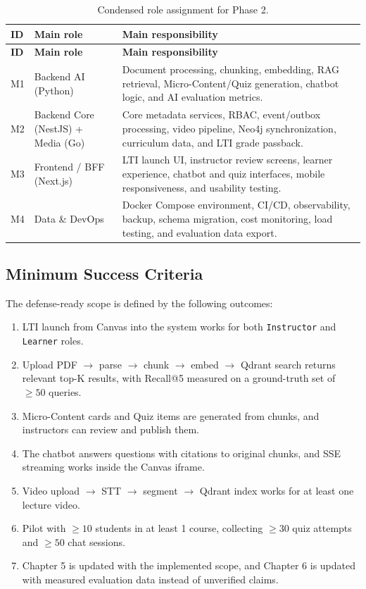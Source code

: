 \begin{longtable}{|p{1.2cm}|p{3.4cm}|p{9.5cm}|}
    \caption{Condensed role assignment for Phase 2.}
    \label{tab:roles-gd2} \\
    \hline
    \textbf{ID} & \textbf{Main role} & \textbf{Main responsibility} \\
    \hline
    \endfirsthead
    \hline
    \textbf{ID} & \textbf{Main role} & \textbf{Main responsibility} \\
    \hline
    \endhead

    M1 & Backend AI (Python)
       & Document processing, chunking, embedding, RAG retrieval,
         Micro-Content/Quiz generation, chatbot logic, and AI evaluation
         metrics. \\
    \hline
    M2 & Backend Core (NestJS) + Media (Go)
       & Core metadata services, RBAC, event/outbox processing, video
         pipeline, Neo4j synchronization, curriculum data, and LTI grade
         passback. \\
    \hline
    M3 & Frontend / BFF (Next.js)
       & LTI launch UI, instructor review screens, learner experience,
         chatbot and quiz interfaces, mobile responsiveness, and
         usability testing. \\
    \hline
    M4 & Data \& DevOps
       & Docker Compose environment, CI/CD, observability, backup,
         schema migration, cost monitoring, load testing, and evaluation
         data export. \\
    \hline
\end{longtable}

\subsection{Minimum Success Criteria}
\label{subsec:priority-gd2}

The defense-ready scope is defined by the following outcomes:
\begin{enumerate}
    \item LTI launch from Canvas into the system works for both
          \texttt{Instructor} and \texttt{Learner} roles.
    \item Upload PDF $\to$ parse $\to$ chunk $\to$ embed $\to$ Qdrant
          search returns relevant top-K results, with Recall@5 measured
          on a ground-truth set of $\geq 50$ queries.
    \item Micro-Content cards and Quiz items are generated from chunks,
          and instructors can review and publish them.
    \item The chatbot answers questions with citations to original
          chunks, and SSE streaming works inside the Canvas iframe.
    \item Video upload $\to$ STT $\to$ segment $\to$ Qdrant index works
          for at least one lecture video.
    \item Pilot with $\geq 10$ students in at least 1 course, collecting
          $\geq 30$ quiz attempts and $\geq 50$ chat sessions.
    \item Chapter 5 is updated with the implemented scope, and Chapter 6
          is updated with measured evaluation data instead of unverified
          claims.
\end{enumerate}

